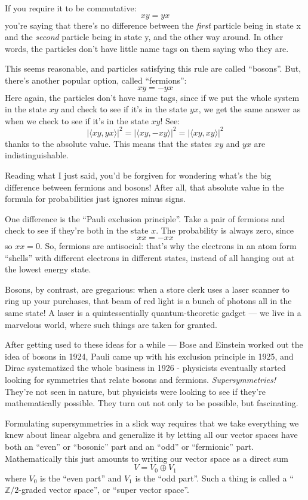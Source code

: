 \documentclass{article}
\begin{document}
If you require it to be commutative: \[xy = yx\] you're saying that
there's no difference between the \emph{first} particle being in state x
and the \emph{second} particle being in state y, and the other way
around. In other words, the particles don't have little name tags on
them saying who they are.

This seems reasonable, and particles satisfying this rule are called
``bosons''. But, there's another popular option, called ``fermions'':
\[xy = -yx\] Here again, the particles don't have name tags, since if we
put the whole system in the state \(xy\) and check to see if it's in the
state \(yx\), we get the same answer as when we check to see if it's in
the state \(xy\)! See:
\[|\langle xy,yx\rangle|^2 = |\langle xy,-xy\rangle|^2 = |\langle xy,xy\rangle|^2\]
thanks to the absolute value. This means that the states \(xy\) and
\(yx\) are indistinguishable.

Reading what I just said, you'd be forgiven for wondering what's the big
difference between fermions and bosons! After all, that absolute value
in the formula for probabilities just ignores minus signs.

One difference is the ``Pauli exclusion principle''. Take a pair of
fermions and check to see if they're both in the state \(x\). The
probability is always zero, since \[xx = -xx\] so \(xx = 0\). So,
fermions are antisocial: that's why the electrons in an atom form
``shells'' with different electrons in different states, instead of all
hanging out at the lowest energy state.

Bosons, by contrast, are gregarious: when a store clerk uses a laser
scanner to ring up your purchases, that beam of red light is a bunch of
photons all in the same state! A laser is a quintessentially
quantum-theoretic gadget --- we live in a marvelous world, where such
things are taken for granted.

After getting used to these ideas for a while --- Bose and Einstein
worked out the idea of bosons in 1924, Pauli came up with his exclusion
principle in 1925, and Dirac systematized the whole business in 1926 -
physicists eventually started looking for symmetries that relate bosons
and fermions. \emph{Supersymmetries!} They're not seen in nature, but
physicists were looking to see if they're mathematically possible. They
turn out not only to be possible, but fascinating.

Formulating supersymmetries in a slick way requires that we take
everything we knew about linear algebra and generalize it by letting all
our vector spaces have both an ``even'' or ``bosonic'' part and an
``odd'' or ``fermionic'' part. Mathematically this just amounts to
writing our vector space as a direct sum \[V = V_0 \oplus V_1\] where
\(V_0\) is the ``even part'' and \(V_1\) is the ``odd part''. Such a
thing is called a ``\(\mathbb{Z}/2\)-graded vector space'', or ``super
vector space''.
\end{document}

